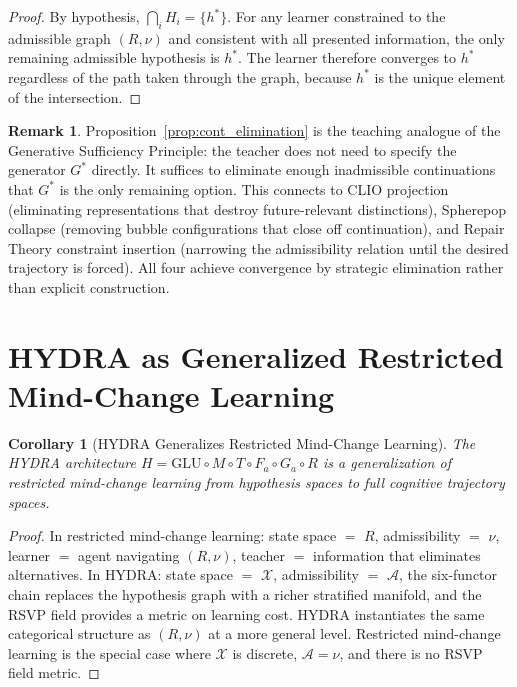 \documentclass[12pt, oneside]{book}
\theoremstyle{flyxion}
\newtheorem{corollary}[theorem]{Corollary}
\theoremstyle{definition}
\newtheorem{remark}[theorem]{Remark}
\begin{document}
\begin{proof}
By hypothesis, $\bigcap_i H_i = \{h^*\}$. For any
learner constrained to the admissible graph $(R, \nu)$
and consistent with all presented information, the
only remaining admissible hypothesis is $h^*$. The
learner therefore converges to $h^*$ regardless of
the path taken through the graph, because $h^*$ is
the unique element of the intersection.
\end{proof}

\begin{remark}
Proposition~\ref{prop:cont_elimination} is the teaching
analogue of the Generative Sufficiency Principle: the
teacher does not need to specify the generator $G^*$
directly. It suffices to eliminate enough inadmissible
continuations that $G^*$ is the only remaining option.
This connects to CLIO projection (eliminating
representations that destroy future-relevant distinctions),
Spherepop collapse (removing bubble configurations that
close off continuation), and Repair Theory constraint
insertion (narrowing the admissibility relation until
the desired trajectory is forced). All four achieve
convergence by strategic elimination rather than
explicit construction.
\end{remark}

\section{HYDRA as Generalized Restricted Mind-Change
         Learning}

\begin{corollary}[HYDRA Generalizes Restricted Mind-Change
Learning]
The HYDRA architecture $H = \mathrm{GLU} \circ M \circ
T \circ F_a \circ G_a \circ R$ is a generalization of
restricted mind-change learning from hypothesis spaces
to full cognitive trajectory spaces.
\end{corollary}

\begin{proof}
In restricted mind-change learning: state space $=$ $R$,
admissibility $=$ $\nu$, learner $=$ agent navigating
$(R,\nu)$, teacher $=$ information that eliminates
alternatives. In HYDRA: state space $=$ $\mathcal{X}$,
admissibility $=$ $\mathcal{A}$, the six-functor chain
replaces the hypothesis graph with a richer stratified
manifold, and the RSVP field provides a metric on
learning cost. HYDRA instantiates the same categorical
structure as $(R, \nu)$ at a more general level.
Restricted mind-change learning is the special case
where $\mathcal{X}$ is discrete, $\mathcal{A} = \nu$,
and there is no RSVP field metric.
\end{proof}
\end{document}
